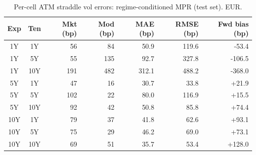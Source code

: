 \begin{table}[H]
\centering
\caption{Per-cell ATM straddle vol errors: regime-conditioned MPR (test set). EUR.}
\label{tab:regime_mpr_per_cell_test}
\small
\begin{tabular}{@{}ccrrrrr@{}}
\toprule
\textbf{Exp} & \textbf{Ten} & \textbf{Mkt (bp)} & \textbf{Mod (bp)} & \textbf{MAE (bp)} & \textbf{RMSE (bp)} & \textbf{Fwd bias (bp)} \\
\midrule
  1Y & 1Y & 56 & 84 & 50.9 & 119.6 & -53.4 \\
  1Y & 5Y & 55 & 135 & 92.7 & 327.8 & -106.5 \\
  1Y & 10Y & 191 & 482 & 312.1 & 488.2 & -368.0 \\
  \midrule
  5Y & 1Y & 47 & 16 & 30.7 & 33.8 & +21.9 \\
  5Y & 5Y & 102 & 22 & 80.0 & 116.9 & +15.5 \\
  5Y & 10Y & 92 & 42 & 50.8 & 85.8 & +74.4 \\
  \midrule
  10Y & 1Y & 79 & 37 & 41.8 & 62.6 & +93.1 \\
  10Y & 5Y & 75 & 29 & 46.2 & 69.0 & +73.1 \\
  10Y & 10Y & 69 & 51 & 35.7 & 53.4 & +128.0 \\
\bottomrule
\end{tabular}
\end{table}